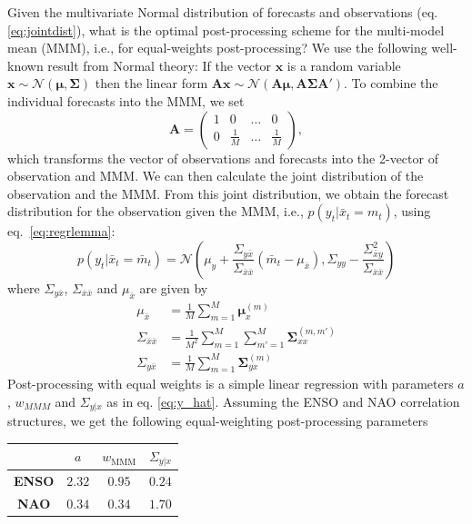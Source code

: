 \documentclass[12pt]{article}
\renewcommand{\vec}[1]{\bm{#1}}
\newcommand{\mat}[1]{\bm{#1}}
\begin{document}
Given the multivariate Normal distribution of forecasts and observations (eq. \ref{eq:jointdist}), what is the optimal post-processing scheme for the multi-model mean (MMM), i.e., for equal-weights post-processing?
We use the following well-known result from Normal theory: If the vector $\vec{x}$ is a random variable $\vec{x}\sim \mathcal{N}(\vec{\mu}, \mat{\Sigma})$ then the linear form $\mat{A}\vec{x} \sim \mathcal{N}(\mat{A}\vec{\mu}, \mat{A}\mat{\Sigma}\mat{A}')$.
To combine the individual forecasts into the MMM, we set
%
\begin{equation}
\mat{A} = \left(\begin{matrix} 1 & 0 & \dots & 0 \\ 0 & \frac1M & \dots & \frac1M\end{matrix}\right),
\end{equation}
%
which transforms the vector of observations and forecasts into the 2-vector of observation and MMM.
We can then calculate the joint distribution of the observation and the MMM. 
From this joint distribution, we obtain the forecast distribution for the observation given the MMM, i.e., $p(y_t | \bar{x}_t = m_t)$, using eq.~\ref{eq:regrlemma}:
%
\begin{equation}
p(y_t|\bar{x}_t = \bar{m}_t) = \mathcal{N}\left(\mu_y + \frac{\Sigma_{y\bar{x}}}{\Sigma_{\bar{x}\bar{x}}} (\bar{m}_t - \mu_{\bar{x}}), \Sigma_{yy} - \frac{\Sigma_{\bar{x}y}^2}{\Sigma_{\bar{x}\bar{x}}}\right)
\end{equation}
%
where $\Sigma_{y\bar{x}}$, $\Sigma_{\bar{x}\bar{x}}$ and $\mu_{\bar{x}}$ are given by 
%
\begin{align}
\mu_{\bar{x}} & = \frac1M \sum_{m=1}^M \vec{\mu}_x^{(m)}\\
\Sigma_{\bar{x}\bar{x}} & = \frac{1}{M^2}\sum_{m=1}^M\sum_{m'=1}^M \mat{\Sigma}_{xx}^{(m,m')} \\
\Sigma_{y\bar{x}} & = \frac1M \sum_{m=1}^M \mat{\Sigma}_{yx}^{(m)}
\end{align}
%
Post-processing with equal weights is a simple linear regression with parameters $a$, $w_{MMM}$ and $\Sigma_{y|x}$ as in eq. \ref{eq:y_hat}.
Assuming the ENSO and NAO correlation structures, we get the following equal-weighting post-processing parameters 
%
\begin{center}
\begin{tabular}{c|ccc}
& $a$ & $w_{\mathrm{MMM}}$ & $\Sigma_{y|x}$ \\
\hline
\textbf{ENSO} & $2.32$ & $0.95$ & $0.24$ \\
\textbf{NAO} & $0.34$ & $0.34$ & $1.70$ 
\end{tabular}
\end{center}
\end{document}

